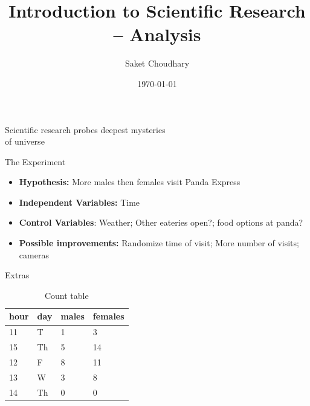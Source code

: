 \documentclass[10pt]{beamer}
\title{Introduction to Scientific Research -- Analysis}
\date{\today}
\author{Saket Choudhary}
\institute{BISC 104\\Session 2}
\begin{document}
\maketitle

\begin{frame}[fragile]
  \Large\begin{center}Scientific research probes deepest mysteries\\
  of universe
  \end{center}
\end{frame}

\begin{frame}[fragile]{The Experiment}
\begin{itemize}[<+- | alert@+>]
\item \textbf{Hypothesis:} More males then females visit Panda Express
\item \textbf{Independent Variables:} Time
\item \textbf{Control Variables}: Weather; Other eateries open?; food options at panda?
\item \textbf{Possible improvements:} Randomize time of visit; More number of visits; cameras
\end{itemize}

\end{frame}

\begin{frame}[fragile]{Extras}
\begin{table}
\begin{tabular}{|l|l|l|l|}
\hline
hour&day&males&females\\
\hline
11&T&1&3\\
\hline
15&Th&5&14\\
\hline
12&F&8&11\\
\hline
13&W&3&8\\
\hline
14&Th&0&0\\
\hline
\end{tabular}
\caption{Count table}
\end{table}
\end{frame}
\end{document}
